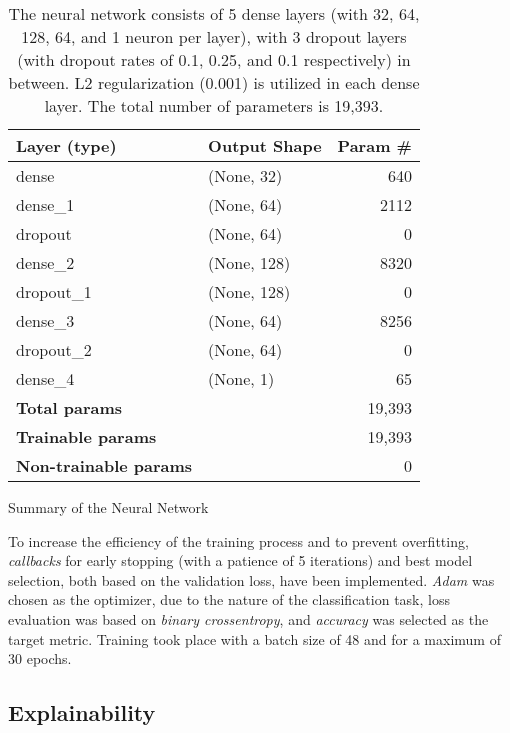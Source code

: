 \begin{table}[h]
    \centering
    \begin{tabularx}{\textwidth}{lXr}
    \hline
    \textbf{Layer (type)} & \textbf{Output Shape} & \textbf{Param \#} \\
    \hline
    dense & (None, 32) & 640 \\
    dense\_1 & (None, 64) & 2112 \\
    dropout & (None, 64) & 0 \\
    dense\_2 & (None, 128) & 8320 \\
    dropout\_1 & (None, 128) & 0 \\
    dense\_3 & (None, 64) & 8256 \\
    dropout\_2 & (None, 64) & 0 \\
    dense\_4 & (None, 1) & 65 \\
    \hline
    \textbf{Total params} & & 19,393 \\
    \textbf{Trainable params} & & 19,393 \\
    \textbf{Non-trainable params} & & 0 \\
    \hline
    \end{tabularx}
    \caption{Summary of the Neural Network}
    \caption*{The neural network consists of 5 dense layers (with 32, 64, 128, 64, and 1 neuron per layer), with 3 dropout layers (with dropout rates of 0.1, 0.25, and 0.1 respectively) in between. L2 regularization (0.001) is utilized in each dense layer. The total number of parameters is 19,393.}
    \label{tab:CH03_Model_Details}
\end{table}

To increase the efficiency of the training process and to prevent overfitting, \textit{callbacks} for early stopping (with a patience of 5 iterations) and best model selection, both based on the validation loss, have been implemented. 
\textit{Adam} was chosen as the optimizer, due to the nature of the classification task, loss evaluation was based on \textit{binary crossentropy}, and \textit{accuracy} was selected as the target metric. Training took place with a batch size of 48 and for a maximum of 30 epochs. 

\subsection{Explainability}\label{subsec:Explainability}

